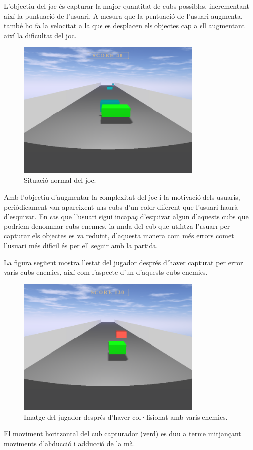 \documentclass[12pt,a4paper,catalan]{article}
\begin{document}
	L'objectiu del joc és capturar la major quantitat de cubs possibles, incrementant així la puntuació de l'usuari. A mesura que la puntuació de l'usuari augmenta, també ho fa la velocitat a la que es desplacen els objectes cap a ell augmentant així la dificultat del joc.
	\begin{figure}[H]
		\includegraphics[width=0.8\textwidth,keepaspectratio]{cubes-road-simple.png}
		\centering
		\caption{Situació normal del joc.}
		\label{fig:cubes-road-simple}
	\end{figure}
	Amb l'objectiu d'augmentar la complexitat del joc i la motivació dels usuaris, periòdicament van apareixent uns cubs d'un color diferent que l'usuari haurà d'esquivar. En cas que l'usuari sigui incapaç d'esquivar algun d'aquests cubs que podríem denominar cubs enemics, la mida del cub que utilitza l'usuari per capturar els objectes es va reduint, d'aquesta manera com més errors comet l'usuari més difícil és per ell seguir amb la partida.
	
	La figura següent mostra l'estat del jugador després d'haver capturat per error varis cubs enemics, així com l'aspecte d'un d'aquests cubs enemics.
	\begin{figure}[H]
		\includegraphics[width=0.8\textwidth,keepaspectratio]{cubes-road-enemy.png}
		\centering
		\caption{Imatge del jugador després d'haver col·lisionat amb varis enemics.}
		\label{fig:cubes-road-enemy}
	\end{figure}
	El moviment horitzontal del cub capturador (verd) es duu a terme mitjançant moviments d'abducció i adducció de la mà.
\end{document}
